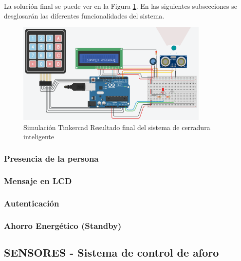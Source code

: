 \documentclass{article}
\begin{document}
La solución final se puede ver en la Figura \ref{fig:cerradura_smart}. En las siguientes subsecciones se desglosarán las diferentes funcionalidades del sistema.

\begin{figure}[H]
    \centering
    \includegraphics[width=0.85\textwidth]{./img/ckpt_6.png}
    \caption{Simulación Tinkercad Resultado final del sistema de cerradura inteligente}
    \label{fig:cerradura_smart}
\end{figure}


\subsubsection{Presencia de la persona}

\subsubsection{Mensaje en LCD}

\subsubsection{Autenticación}

\subsubsection{Ahorro Energético (Standby)}

\subsection{SENSORES - Sistema de control de aforo}

\end{document}
